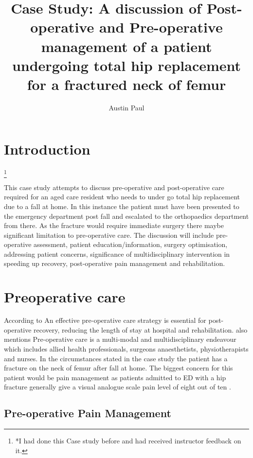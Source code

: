 \documentclass[a4paper,man,british]{apa6}
\title{Case Study: A discussion of Post-operative and Pre-operative management of a patient undergoing total hip replacement for a fractured neck of femur}
\author{Austin Paul}
\affiliation{RMIT UNIVERSITY \\ s3634517 \\ Word Count : 000}
\newcommand\blfootnote[1]{%
  \begingroup
  \renewcommand\thefootnote{}\footnote{#1}%
  \addtocounter{footnote}{-1}%
  \endgroup
}
\begin{document}
\maketitle

\section{}
\section{Introduction} %
%
\blfootnote{*I had done this Case study before and had received instructor feedback on it.}
This case study attempts to discuss pre-operative and post-operative care required for an aged care resident who needs to under go total hip replacement due to a fall at home. In this instance the patient must have been presented to the emergency department post fall and escalated to the orthopaedics department from there. As the fracture would require immediate surgery there maybe significant limitation to pre-operative care. The discussion will include pre-operative assessment, patient education/information, surgery optimisation, addressing patient concerns, significance of multidisciplinary intervention in speeding up recovery, post-operative pain management and rehabilitation.




\section{Preoperative care} %

According to \textcite{molko_rapid_2017} An effective pre-operative care strategy is essential for post-operative recovery, reducing the length of stay at hospital and rehabilitation. \citeauthor{molko_rapid_2017} also mentions Pre-operative care is a multi-modal and multidisciplinary endeavour which includes allied health professionals, surgeons anaesthetists, physiotherapists and nurses. In the circumstances  stated in the case study the patient has a fracture on the neck of femur after fall at home. The biggest concern for this patient would be pain management as patients admitted to ED with a hip fracture generally give a visual analogue scale pain level of eight out of ten \parencite{monzon_pain_2010}.
\newpage
\subsection{Pre-operative Pain Management}
\end{document}
